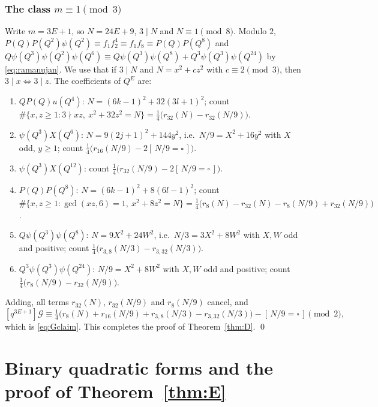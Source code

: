 \documentclass[11pt]{amsart}
\theoremstyle{definition}
\theoremstyle{remark}
\numberwithin{equation}{section}
\newcommand{\sq}{\square}
\newcommand{\ind}[1]{[\,#1\,]}
\begin{document}
\subsubsection*{The class $m\equiv1\pmod 3$}
Write $m=3E+1$, so $N=24E+9$, $3\mid N$ and $N\equiv1\pmod 8$. Modulo $2$, $P(Q)P(Q^2)\psi(Q^2)\equiv f_1f_2^4\equiv f_1f_8\equiv P(Q)P(Q^8)$ and $Q\psi(Q^3)\psi(Q^2)\psi(Q^6)\equiv Q\psi(Q^3)\psi(Q^8)+Q^3\psi(Q^3)\psi(Q^{24})$ by \eqref{eq:ramanujan}. We use that if $3\mid N$ and $N=x^2+cz^2$ with $c\equiv2\pmod 3$, then $3\mid x\iff 3\mid z$. The coefficients of $Q^E$ are:
\begin{enumerate}[label=\textup{(\arabic*)}]
\item $QP(Q)u(Q^4)$: $N=(6k-1)^2+32(3l+1)^2$; count $\#\{x,z\ge1: 3\nmid xz,\ x^2+32z^2=N\}=\frac14\big(r_{32}(N)-r_{32}(N/9)\big)$.
\item $\psi(Q^3)X(Q^6)$: $N=9(2j+1)^2+144y^2$, i.e.\ $N/9=X^2+16y^2$ with $X$ odd, $y\ge1$; count $\frac14\big(r_{16}(N/9)-2\ind{N/9=\sq}\big)$.
\item $\psi(Q^3)X(Q^{12})$: count $\frac14\big(r_{32}(N/9)-2\ind{N/9=\sq}\big)$.
\item $P(Q)P(Q^8)$: $N=(6k-1)^2+8(6l-1)^2$; count $\#\{x,z\ge1: \gcd(xz,6)=1,\ x^2+8z^2=N\}=\frac14\big(r_8(N)-r_{32}(N)-r_8(N/9)+r_{32}(N/9)\big)$.
\item $Q\psi(Q^3)\psi(Q^8)$: $N=9X^2+24W^2$, i.e.\ $N/3=3X^2+8W^2$ with $X,W$ odd and positive; count $\frac14\big(r_{3,8}(N/3)-r_{3,32}(N/3)\big)$.
\item $Q^3\psi(Q^3)\psi(Q^{24})$: $N/9=X^2+8W^2$ with $X,W$ odd and positive; count $\frac14\big(r_8(N/9)-r_{32}(N/9)\big)$.
\end{enumerate}
Adding, all terms $r_{32}(N)$, $r_{32}(N/9)$ and $r_8(N/9)$ cancel, and
\[
[q^{3E+1}]\mathcal G\equiv\tfrac14\big(r_8(N)+r_{16}(N/9)+r_{3,8}(N/3)-r_{3,32}(N/3)\big)-\ind{N/9=\sq}\pmod 2 ,
\]
which is \eqref{eq:Gclaim}. This completes the proof of Theorem~\ref{thm:D}. \qed

\section{Binary quadratic forms and the proof of Theorem~\ref{thm:E}}\label{sec:forms}
\end{document}
